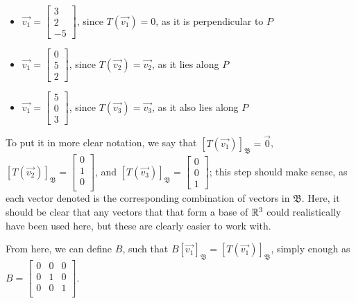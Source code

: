 \documentclass[12pt]{article}
\begin{document}
\begin{itemize}
    \item $\vec{v_1} = \begin{bmatrix}
        3\\
        2\\
        -5
    \end{bmatrix}$, since $T(\vec{v_1}) = 0$, as it is perpendicular to $P$

    \item $\vec{v_1} = \begin{bmatrix}
        0\\
        5\\
        2
    \end{bmatrix}$, since $T(\vec{v_2}) = \vec{v_2}$, as it lies along $P$

    \item $\vec{v_1} = \begin{bmatrix}
        5\\
        0\\
        3
    \end{bmatrix}$, since $T(\vec{v_3}) = \vec{v_3}$, as it also lies along $P$
\end{itemize}

To put it in more clear notation, we say that $[T(\vec{v_1})]_{\mathfrak{B}} = \vec{0}$, $[T(\vec{v_2})]_{\mathfrak{B}} = \begin{bmatrix}
0\\
1\\
0\\\end{bmatrix}$, and $[T(\vec{v_3})]_{\mathfrak{B}} = \begin{bmatrix}
    0\\
    0\\
    1\end{bmatrix}$; this step should make sense, as each vector denoted is the corresponding combination of vectors in $\mathfrak{B}$. Here, it should be clear that any vectors that that form a base of $\mathbb{R}^{3}$ could realistically have been used here, but these are clearly easier to work with.

    From here, we can define $B$, such that $B[\vec{v_1}]_{\mathfrak{B}} = [T(\vec{v_1})]_{\mathfrak{B}}$, simply enough as $B = \begin{bmatrix}
        0 & 0 & 0\\
        0 & 1 & 0\\
        0 & 0 & 1\\
    \end{bmatrix}$.
\end{document}
